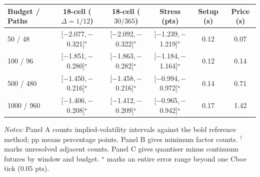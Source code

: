 \begin{table}[!htbp]
\begin{tabular}{@{}lcccccc@{}}
\addlinespace[1.5pt]
Budget / Paths & \multicolumn{2}{c}{18-cell ($\Delta=1/12$)} & 18-cell ($30/365$) & Stress (pts) & Setup (s) & Price (s) \\\midrule
50 / 48 & \multicolumn{2}{c}{[$-$2.077,\,$-$0.321]$^\star$} & [$-$2.092,\,$-$0.322]$^\star$ & [$-$1.239,\,$-$1.219]$^\star$ & 0.12 & 0.07 \\
100 / 96 & \multicolumn{2}{c}{[$-$1.851,\,$-$0.280]$^\star$} & [$-$1.863,\,$-$0.282]$^\star$ & [$-$1.184,\,$-$1.164]$^\star$ & 0.12 & 0.14 \\
500 / 480 & \multicolumn{2}{c}{[$-$1.450,\,$-$0.216]$^\star$} & [$-$1.458,\,$-$0.216]$^\star$ & [$-$0.994,\,$-$0.972]$^\star$ & 0.14 & 0.71 \\
1000 / 960 & \multicolumn{2}{c}{[$-$1.406,\,$-$0.208]$^\star$} & [$-$1.412,\,$-$0.209]$^\star$ & [$-$0.965,\,$-$0.942]$^\star$ & 0.17 & 1.42 \\
\bottomrule\end{tabular}
\smallskip\par\raggedright\scriptsize\emph{Notes:} Panel A counts implied-volatility intervals against the bold reference method; pp means percentage points. Panel B gives minimum factor counts. $^\dagger$ marks unresolved adjacent counts. Panel C gives quantiser minus continuum futures by window and budget. $^\star$ marks an entire error range beyond one Cboe tick ($0.05$ pts).
\end{table}
